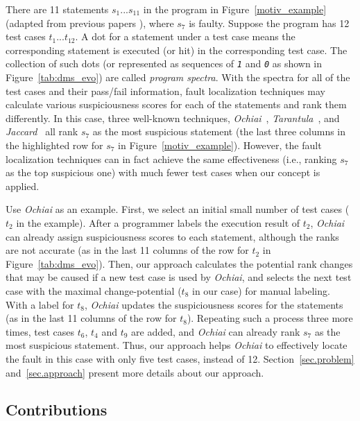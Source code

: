There are 11 statements $s_{1}...s_{11}$ in the program in Figure~\ref{motiv_example} (adapted from previous papers \citep{Gonzalez-SanchezPAGG11,JiangCT11}), where $s_{7}$ is faulty. Suppose the program has 12 test cases $t_{1}...t_{12}$. A dot for a statement under a test case means the corresponding statement is executed (or hit) in the corresponding test case. The collection of such dots (or represented as sequences of \texttt{\textit{1}} and \texttt{\textit{0}} as shown in Figure~\ref{tab:dms_evo}) are called {\em program spectra}. With the spectra for all of the test cases and their pass/fail information, fault localization techniques may calculate various suspiciousness scores for each of the statements and rank them differently. In this case, three well-known techniques, {\em Ochiai}~\citep{Abreu:2009.jss}, {\em Tarantula}~\citep{JH05}, and {\em Jaccard}~\citep{Abreu:2009.jss} all rank $s_{7}$ as the most suspicious statement (the last three columns in the highlighted row for $s_{7}$ in Figure~\ref{motiv_example}). However, the fault localization techniques can in fact achieve the same effectiveness (i.e., ranking $s_{7}$ as the top suspicious one) with much fewer test cases when our concept is applied.

Use {\em Ochiai} as an example. First, we select an initial small number of test cases ($t_{2}$ in the example). After a programmer labels the execution result of $t_{2}$, {\em Ochiai} can already assign suspiciousness scores to each statement, although the ranks are not accurate (as in the last 11 columns of the row for $t_{2}$ in Figure~\ref{tab:dms_evo}). Then, our approach calculates the potential rank changes that may be caused if a new test case is used by {\em Ochiai}, and selects the next test case with the maximal change-potential ($t_{8}$ in our case) for manual labeling. With a label for $t_{8}$, {\em Ochiai} updates the suspiciousness scores for the statements (as in the last 11 columns of the row for $t_{8}$). Repeating such a process three more times, test cases $t_{6}$, $t_{4}$ and $t_{9}$ are added, and {\em Ochiai} can already rank $s_{7}$ as the most suspicious statement. Thus, our approach helps {\em Ochiai} to effectively locate the fault in this case with only five test cases, instead of 12. Section~\ref{sec.problem} and~\ref{sec.approach} present more details about our approach.

\subsection{Contributions}


